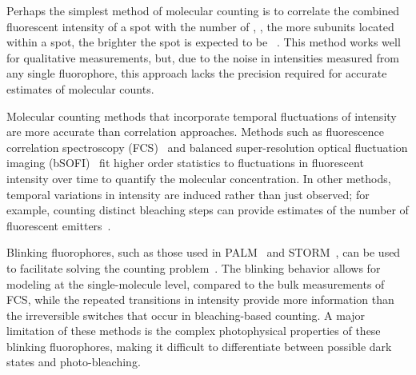 %
%


%
Perhaps the simplest method of molecular counting is to correlate the combined
fluorescent intensity of a spot with the number of \smallobjects, \ie, the more subunits 
located within a spot, the brighter the spot is expected to be ~\citep{schmied_2012,
tolar_2005}.
  This method works well for qualitative measurements, but, due to the noise in
  intensities measured from any single fluorophore, this approach lacks the precision 
  required for accurate estimates of molecular counts. 

%
Molecular counting methods that incorporate temporal fluctuations of intensity
are more accurate than correlation approaches.
  Methods such as fluorescence correlation spectroscopy
  (FCS)~\citep{otsuka_2023,wachsmuth_2015,politi_2018} and balanced
  super-resolution optical fluctuation imaging
  (bSOFI)~\citep{geissbuehler_2012} fit higher order statistics to fluctuations
  in fluorescent intensity over time to quantify the molecular concentration.
  In other methods, temporal variations in intensity are induced rather than
  just observed; for example, counting distinct bleaching
  steps can provide estimates of the number of fluorescent
  emitters~\citep{ulbrich_2007,jain_2011,hummert_2021, garry_bayesian_2020}.

%
Blinking fluorophores, such as those used in
PALM~\citep{sengupta_pcPALM_2011,lee_counting_2012} and
STORM~\citep{patel_blinking_2021}, can be used to facilitate solving the counting
problem~\citep{rollins_stochastic_2015,nino_2017}.
  The blinking behavior allows for modeling at the single-molecule level, compared 
  to the bulk measurements of FCS, while the repeated transitions in
  intensity provide more information than the irreversible switches that occur 
  in bleaching-based counting.
  A major limitation of these methods is the complex photophysical properties of 
  these blinking fluorophores, making it difficult to differentiate between possible 
  dark states and photo-bleaching. 

